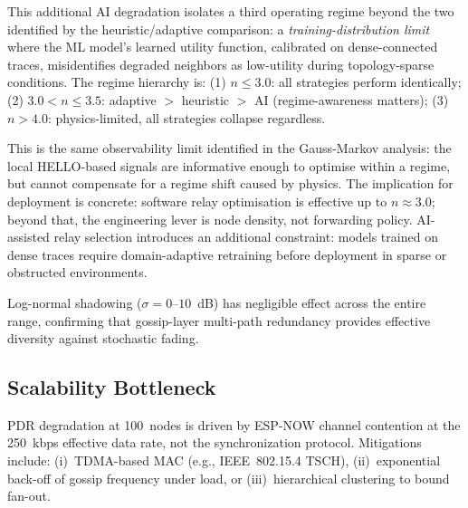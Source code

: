 \documentclass[conference]{IEEEtran}
\begin{document}
This additional AI degradation isolates a third operating regime beyond
the two identified by the heuristic/adaptive comparison: a
\emph{training-distribution limit} where the ML model's learned utility
function, calibrated on dense-connected traces, misidentifies degraded
neighbors as low-utility during topology-sparse conditions.  The regime
hierarchy is: (1) $n \leq 3.0$: all strategies perform identically;
(2) $3.0 < n \leq 3.5$: adaptive $>$ heuristic $>$ AI (regime-awareness matters);
(3) $n > 4.0$: physics-limited, all strategies collapse regardless.

This is the same observability limit identified in the Gauss-Markov
analysis: the local HELLO-based signals are informative enough to
optimise within a regime, but cannot compensate for a regime shift caused
by physics.  The implication for deployment is concrete: software relay
optimisation is effective up to $n \approx 3.0$; beyond that, the
engineering lever is node density, not forwarding policy.  AI-assisted
relay selection introduces an additional constraint: models trained on
dense traces require domain-adaptive retraining before deployment in
sparse or obstructed environments.

Log-normal shadowing ($\sigma = 0$--$10$~dB) has negligible effect across
the entire range, confirming that gossip-layer multi-path redundancy
provides effective diversity against stochastic fading.

\subsection{Scalability Bottleneck}
PDR degradation at 100~nodes is driven by ESP-NOW channel contention at the
250~kbps effective data rate, not the synchronization protocol.  Mitigations
include: (i)~TDMA-based MAC (e.g., IEEE~802.15.4 TSCH), (ii)~exponential
back-off of gossip frequency under load, or (iii)~hierarchical clustering to
bound fan-out.
\end{document}
